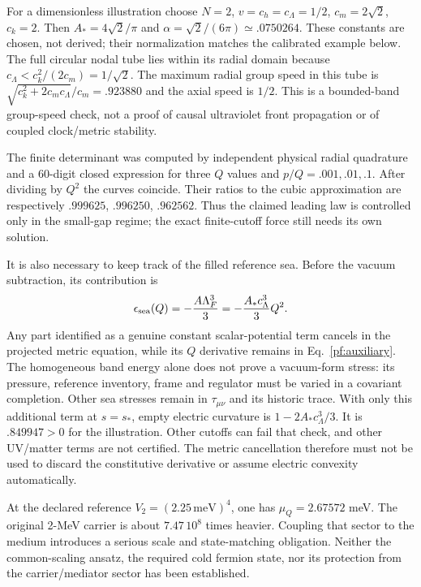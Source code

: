 \documentclass[11pt]{article}
\begin{document}
For a dimensionless illustration choose
$N=2$, $v=c_h=c_\Lambda=1/2$, $c_m=2\sqrt2$, $c_k=2$.
Then $A_*=4\sqrt2/\pi$ and
$\alpha=\sqrt2/(6\pi)\simeq.0750264$. These constants are chosen, not
derived; their normalization matches the calibrated example below.
The full circular nodal tube lies within its radial domain because
$c_\Lambda<c_k^2/(2c_m)=1/\sqrt2$.
The maximum radial group speed in this tube is
$\sqrt{c_k^2+2c_mc_\Lambda}/c_m=.923880$ and the axial speed is $1/2$.
This is a bounded-band group-speed check, not a proof of causal ultraviolet
front propagation or of coupled clock/metric stability.

The finite determinant was computed by independent physical radial
quadrature and a 60-digit closed expression for three $Q$ values and
$p/Q=.001,.01,.1$. After dividing by $Q^2$ the curves coincide.
Their ratios to the cubic approximation are respectively
$.999625$, $.996250$, $.962562$. Thus the claimed leading law is controlled
only in the small-gap regime; the exact finite-cutoff force still needs
its own solution.

It is also necessary to keep track of the filled reference sea. Before
the vacuum subtraction, its contribution is
\begin{equation}
 \epsilon_{\rm sea}(Q)=-{A\Lambda_F^3\over3}
       =-{A_*c_\Lambda^3\over3}Q^2.
\end{equation}
Any part identified as a genuine constant scalar-potential term cancels
in the projected metric equation, while its $Q$ derivative remains in
Eq.~\eqref{pf:auxiliary}. The homogeneous band energy alone does not prove
a vacuum-form stress: its pressure, reference inventory, frame and regulator
must be varied in a covariant completion. Other sea stresses remain in
$\tau_{\mu\nu}$ and its historic trace. With only this
additional term at $s=s_*$, empty electric curvature is
$1-2A_*c_\Lambda^3/3$. It is $.849947>0$ for the illustration.
Other cutoffs can fail that check, and other UV/matter terms are not
certified. The metric cancellation therefore must not be used to discard
the constitutive derivative or assume electric convexity automatically.

At the declared reference $V_2=(2.25\,\mathrm{meV})^4$, one has
$\mu_Q=2.67572$ meV. The original 2-MeV carrier is about
$7.47\,10^8$ times heavier. Coupling that sector to the medium introduces
a serious scale and state-matching obligation. Neither the common-scaling
ansatz, the required cold fermion state, nor its protection from the
carrier/mediator sector has been established.
\end{document}
